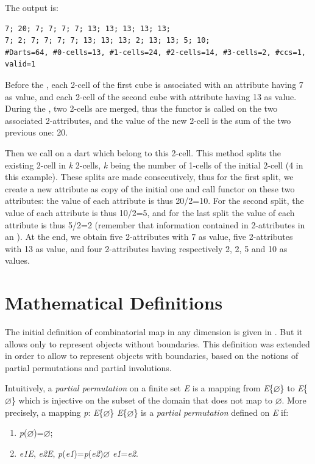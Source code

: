 
The output is:
\begin{verbatim}
7; 20; 7; 7; 7; 7; 13; 13; 13; 13; 13; 
7; 2; 7; 7; 7; 7; 13; 13; 13; 2; 13; 13; 5; 10; 
#Darts=64, #0-cells=13, #1-cells=24, #2-cells=14, #3-cells=2, #ccs=1, valid=1
\end{verbatim}

Before the , each 2-cell of the first cube is
associated with an attribute having 7 as value, and each 2-cell of the
second cube with attribute having 13 as value. During the
, two 2-cells are merged, thus the functor
 is called on the two associated 2-attributes, and
the value of the new 2-cell is the sum of the two previous one: 20.

Then we call  on a dart which
belong to this 2-cell. This method splits the existing 2-cell in \emph{k}
2-cells, \emph{k} being the number of 1-cells of the initial 2-cell (4 in
this example). These splits are made consecutively, thus for the first
split, we create a new attribute as copy of the initial one and call
functor  on these two attributes: the value
of each attribute is thus 20/2=10. For the second split, the value of
each attribute is thus 10/2=5, and for the last split the value of
each attribute is thus 5/2=2 (remember that information contained in
2-attributes in an ).  At the end, we obtain five
2-attributes with 7 as value, five 2-attributes with 13 as value, and
four 2-attributes having respectively 2, 2, 5 and 10 as values.

\section{Mathematical Definitions}\label{sec_definition}

The initial definition of combinatorial map in any dimension is given
in \cite{cgal:l-tmbrc-91,l-ndgcm-94}. But it allows only to represent
objects without boundaries. This definition was extended
\cite{cgal:pabl-cco-07,cgal:d-ccccg-10} in order to allow to represent 
objects with boundaries, based on the notions of partial permutations 
and partial involutions.

Intuitively, a \emph{partial permutation} on a finite set \emph{E} is a
mapping from \emph{E}\mycup{}\{$\varnothing$\} to \emph{E}\mycup{}\{$\varnothing$\} which is
injective on the subset of the domain that does not map to
$\varnothing$.  More precisely, a mapping \emph{p}: \emph{E}\mycup{}\{$\varnothing$\}
\myrightarrow{} \emph{E}\mycup{}\{$\varnothing$\} is a \emph{partial permutation}
defined on \emph{E} if:
\begin{enumerate}
\item \emph{p}($\varnothing$)=$\varnothing$;
\item \myforall{}\emph{e1}\myin{}\emph{E}, \myforall{}\emph{e2}\myin{}\emph{E},
  \emph{p}(\emph{e1})=\emph{p}(\emph{e2})\myneq{}$\varnothing$ \myRightarrow{} \emph{e1}=\emph{e2}.
\end{enumerate}

